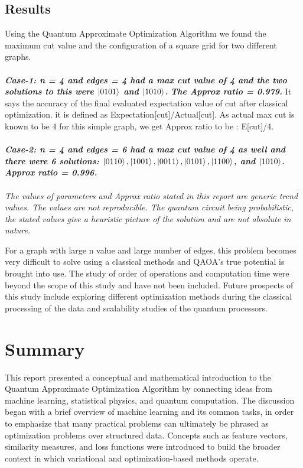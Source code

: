 \documentclass[english,12pt,a4paper]{report}
\begin{document}
	\section{Results}
	\hspace{1.15em}Using the Quantum Approximate Optimization Algorithm we found the maximum cut value and the configuration of a square grid for two different graphs.
	\\\\
	\emph{\textbf{	Case-1: n = 4 and edges = 4 had a max cut value of 4 and the two solutions to this were $\ket{0101}$ and $\ket{1010}$.}}
	\emph{\textbf{The Approx ratio = 0.979.}} It says the accuracy of the final evaluated expectation value of cut after classical optimization. it is defined as Expectation[cut]/Actual[cut]. As actual max cut is known to be 4 for this simple graph, we get Approx ratio to be : E[cut]/4.\\\\
	\textbf{\emph{	Case-2: n = 4 and edges = 6 had a max cut value of 4 as well and there were 6 solutions: $\ket{0110},\ket{1001},\ket{0011},\ket{0101},\ket{1100}$, and $\ket{1010}$. Approx ratio = 0.996.}}\\\\
	\emph{The values of parameters and Approx ratio stated in this report are generic trend values. The values are not reproducible. The quantum circuit being probabilistic, the stated values give a heuristic picture of the solution and are not absolute in nature.}
	
	For a graph with large n value and large number of edges, this problem becomes very difficult to solve using a classical methods and QAOA's true potential is brought into use. The study of order of operations and computation time were beyond the scope of this study and have not been included. Future prospects of this study include exploring different optimization methods during the classical processing of the data and scalability studies of the quantum processors. 
	\chapter{Summary}
	\hspace{1.15em}This report presented a conceptual and mathematical introduction to the Quantum Approximate Optimization Algorithm by connecting ideas from machine learning, statistical physics, and quantum computation. The discussion began with a brief overview of machine learning and its common tasks, in order to emphasize that many practical problems can ultimately be phrased as optimization problems over structured data. Concepts such as feature vectors, similarity measures, and loss functions were introduced to build the broader context in which variational and optimization-based methods operate.
	
\end{document}
